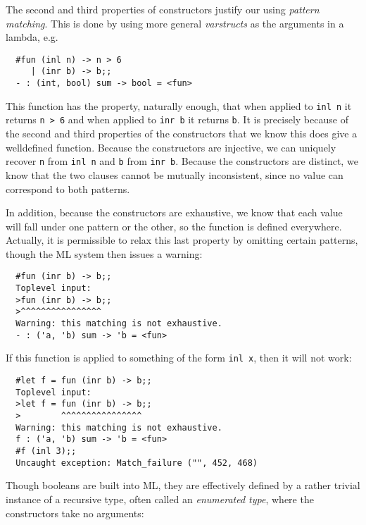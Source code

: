 The second and third properties of constructors justify our using {\em pattern
matching}. This is done by using more general {\em varstructs} as the arguments
in a lambda, e.g.

\begin{boxed}\begin{verbatim}
  #fun (inl n) -> n > 6
     | (inr b) -> b;;
  - : (int, bool) sum -> bool = <fun>
\end{verbatim}\end{boxed}

\noindent This function has the property, naturally enough, that when applied
to {\tt inl n} it returns {\verb+n > 6+} and when applied to {\tt inr b} it
returns {\tt b}. It is precisely because of the second and third properties of
the constructors that we know this does give a welldefined function. Because
the constructors are injective, we can uniquely recover {\tt n} from {\tt inl
n} and {\tt b} from {\tt inr b}. Because the constructors are distinct, we know
that the two clauses cannot be mutually inconsistent, since no value can
correspond to both patterns.

In addition, because the constructors are exhaustive, we know that each value
will fall under one pattern or the other, so the function is defined
everywhere. Actually, it is permissible to relax this last property by omitting
certain patterns, though the ML system then issues a warning:

\begin{boxed}\begin{verbatim}
  #fun (inr b) -> b;;
  Toplevel input:
  >fun (inr b) -> b;;
  >^^^^^^^^^^^^^^^^
  Warning: this matching is not exhaustive.
  - : ('a, 'b) sum -> 'b = <fun>
\end{verbatim}\end{boxed}

If this function is applied to something of the form {\tt inl x}, then it will
not work:

\begin{boxed}\begin{verbatim}
  #let f = fun (inr b) -> b;;
  Toplevel input:
  >let f = fun (inr b) -> b;;
  >        ^^^^^^^^^^^^^^^^
  Warning: this matching is not exhaustive.
  f : ('a, 'b) sum -> 'b = <fun>
  #f (inl 3);;
  Uncaught exception: Match_failure ("", 452, 468)
\end{verbatim}\end{boxed}

Though booleans are built into ML, they are effectively defined by a rather
trivial instance of a recursive type, often called an {\em enumerated type},
where the constructors take no arguments:

